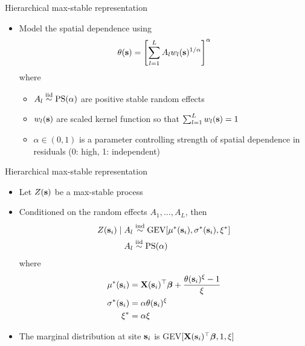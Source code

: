 \documentclass{beamer}
\begin{document}
\begin{frame}{Hierarchical max-stable representation}
	\begin{itemize} \setlength{\itemsep}{1em}
		\item Model the spatial dependence using
		\begin{align*}
		\theta(\mathbf{s}) = \left[\sum_{l = 1}^L A_l w_l(\mathbf{s})^{1 / \alpha}\right]^\alpha
		\end{align*}
		where
		\begin{itemize} \setlength{\itemsep}{0.5em}
			\item $A_l \stackrel{\mathrm{iid}}{\sim} \text{PS}(\alpha)$ are positive stable random effects
			\item $w_l(\mathbf{s})$ are scaled kernel function so that $\sum_{l = 1}^L w_l(\mathbf{s}) = 1$
			\item $\alpha \in (0, 1)$ is a parameter controlling strength of spatial dependence in residuals (0: high, 1: independent)
		\end{itemize}
	\end{itemize}
\end{frame}

\begin{frame}{Hierarchical max-stable representation}
	\begin{itemize} \setlength{\itemsep}{1em}
		\item Let $Z(\mathbf{s})$ be a max-stable process
		\item Conditioned on the random effects $A_1, \ldots, A_L$, then
		\begin{align*}
		Z(\mathbf{s}_i) \mid A_l &\stackrel{\mathrm{ind}}{\sim} \text{GEV}[\mu^*(\mathbf{s}_i), \sigma^*(\mathbf{s}_i), \xi^*] \\
		A_l &\stackrel{\mathrm{iid}}{\sim} \text{PS}(\alpha)
		\end{align*}
		where
		\begin{align*}
			\mu^*(\mathbf{s}_i) &= \mathbf{X}(\mathbf{s}_i)^\top \mbox{\boldmath $\beta$} +  \frac{\theta(\mathbf{s}_i)^{\xi} - 1}{\xi}\\
			\sigma^*(\mathbf{s}_i) &= \alpha \theta(\mathbf{s}_i)^{\xi}\\
			\xi^* &= \alpha \xi
		\end{align*}
		\item The marginal distribution at site $\mathbf{s}_i$ is GEV$[\mathbf{X}(\mathbf{s}_i)^\top \mbox{\boldmath $\beta$}, 1, \xi]$
	\end{itemize}
\end{frame}
\end{document}
